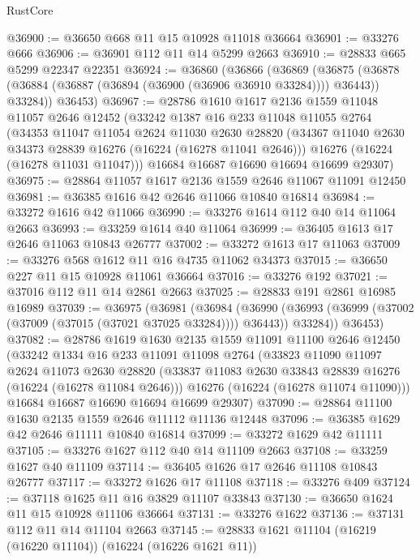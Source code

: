 \begin{lexlean}{RustCore}
\begin{coremodule}
@36900 := @36650 @668 @11 @15 @10928 @11018 @36664
@36901 := @33276 @666
@36906 := @36901 @112 @11 @14 @5299 @2663
@36910 := @28833 @665 @5299 @22347 @22351
@36924 := @36860
    (@36866
      (@36869
        (@36875 (@36878 (@36884 (@36887 (@36894 (@36900 (@36906 @36910 @33284)))) @36443)) @33284))
      @36453)
@36967 := @28786
    @1610
    @1617
    @2136
    @1559
    @11048
    @11057
    @2646
    @12452
    (@33242
      @1387
      @16
      @233
      @11048
      @11055
      @2764
      (@34353
        @11047
        @11054
        @2624
        @11030
        @2630
        @28820
        (@34367 @11040 @2630 @34373 @28839 @16276 (@16224 (@16278 @11041 @2646)))
        @16276
        (@16224 (@16278 @11031 @11047)))
      @16684
      @16687
      @16690
      @16694
      @16699
      @29307)
@36975 := @28864 @11057 @1617 @2136 @1559 @2646 @11067 @11091 @12450
@36981 := @36385 @1616 @42 @2646 @11066 @10840 @16814
@36984 := @33272 @1616 @42 @11066
@36990 := @33276 @1614 @112 @40 @14 @11064 @2663
@36993 := @33259 @1614 @40 @11064
@36999 := @36405 @1613 @17 @2646 @11063 @10843 @26777
@37002 := @33272 @1613 @17 @11063
@37009 := @33276 @568 @1612 @11 @16 @4735 @11062 @34373
@37015 := @36650 @227 @11 @15 @10928 @11061 @36664
@37016 := @33276 @192
@37021 := @37016 @112 @11 @14 @2861 @2663
@37025 := @28833 @191 @2861 @16985 @16989
@37039 := @36975
    (@36981
      (@36984
        (@36990 (@36993 (@36999 (@37002 (@37009 (@37015 (@37021 @37025 @33284)))) @36443)) @33284))
      @36453)
@37082 := @28786
    @1619
    @1630
    @2135
    @1559
    @11091
    @11100
    @2646
    @12450
    (@33242
      @1334
      @16
      @233
      @11091
      @11098
      @2764
      (@33823
        @11090
        @11097
        @2624
        @11073
        @2630
        @28820
        (@33837 @11083 @2630 @33843 @28839 @16276 (@16224 (@16278 @11084 @2646)))
        @16276
        (@16224 (@16278 @11074 @11090)))
      @16684
      @16687
      @16690
      @16694
      @16699
      @29307)
@37090 := @28864 @11100 @1630 @2135 @1559 @2646 @11112 @11136 @12448
@37096 := @36385 @1629 @42 @2646 @11111 @10840 @16814
@37099 := @33272 @1629 @42 @11111
@37105 := @33276 @1627 @112 @40 @14 @11109 @2663
@37108 := @33259 @1627 @40 @11109
@37114 := @36405 @1626 @17 @2646 @11108 @10843 @26777
@37117 := @33272 @1626 @17 @11108
@37118 := @33276 @409
@37124 := @37118 @1625 @11 @16 @3829 @11107 @33843
@37130 := @36650 @1624 @11 @15 @10928 @11106 @36664
@37131 := @33276 @1622
@37136 := @37131 @112 @11 @14 @11104 @2663
@37145 := @28833 @1621 @11104 (@16219 (@16220 @11104)) (@16224 (@16226 @1621 @11))

\end{coremodule}
\end{lexlean}
